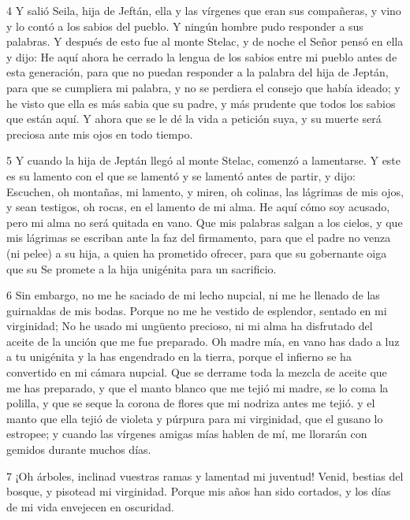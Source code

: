 \par 4 Y salió Seila, hija de Jeftán, ella y las vírgenes que eran sus compañeras, y vino y lo contó a los sabios del pueblo. Y ningún hombre pudo responder a sus palabras. Y después de esto fue al monte Stelac, y de noche el Señor pensó en ella y dijo: He aquí ahora he cerrado la lengua de los sabios entre mi pueblo antes de esta generación, para que no puedan responder a la palabra del hija de Jeptán, para que se cumpliera mi palabra, y no se perdiera el consejo que había ideado; y he visto que ella es más sabia que su padre, y más prudente que todos los sabios que están aquí. Y ahora que se le dé la vida a petición suya, y su muerte será preciosa ante mis ojos en todo tiempo.

\par 5 Y cuando la hija de Jeptán llegó al monte Stelac, comenzó a lamentarse. Y este es su lamento con el que se lamentó y se lamentó antes de partir, y dijo: Escuchen, oh montañas, mi lamento, y miren, oh colinas, las lágrimas de mis ojos, y sean testigos, oh rocas, en el lamento de mi alma. He aquí cómo soy acusado, pero mi alma no será quitada en vano. Que mis palabras salgan a los cielos, y que mis lágrimas se escriban ante la faz del firmamento, para que el padre no venza (ni pelee) a su hija, a quien ha prometido ofrecer, para que su gobernante oiga que su Se promete a la hija unigénita para un sacrificio.

\par 6 Sin embargo, no me he saciado de mi lecho nupcial, ni me he llenado de las guirnaldas de mis bodas. Porque no me he vestido de esplendor, sentado en mi virginidad; No he usado mi ungüento precioso, ni mi alma ha disfrutado del aceite de la unción que me fue preparado. Oh madre mía, en vano has dado a luz a tu unigénita y la has engendrado en la tierra, porque el infierno se ha convertido en mi cámara nupcial. Que se derrame toda la mezcla de aceite que me has preparado, y que el manto blanco que me tejió mi madre, se lo coma la polilla, y que se seque la corona de flores que mi nodriza antes me tejió. y el manto que ella tejió de violeta y púrpura para mi virginidad, que el gusano lo estropee; y cuando las vírgenes amigas mías hablen de mí, me llorarán con gemidos durante muchos días.

\par 7 ¡Oh árboles, inclinad vuestras ramas y lamentad mi juventud! Venid, bestias del bosque, y pisotead mi virginidad. Porque mis años han sido cortados, y los días de mi vida envejecen en oscuridad.

